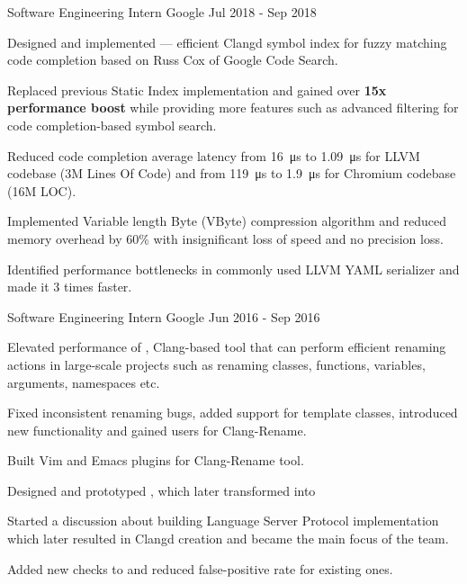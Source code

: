 \begin{cventries}
  \cventry
    {Software Engineering Intern}
    {Google}
    {}
    {Jul 2018 - Sep 2018}
    {
      \begin{cvitems}
        \item Designed and implemented
          --- efficient Clangd symbol index for fuzzy matching code completion
          based on Russ Cox
           of Google
          Code Search.
        \item Replaced previous Static Index implementation and gained over
          \textbf{15x performance boost} while providing more features such as
          advanced filtering for code completion-based symbol search.
        \item Reduced code completion average latency from \SI{16}{\us} to
          \SI{1.09}{\us} for LLVM codebase (3M Lines Of Code) and from
          \SI{119}{\us} to \SI{1.9}{\us} for Chromium codebase (16M LOC).
        \item Implemented Variable length Byte (VByte) compression algorithm
          and reduced memory overhead by 60\% with insignificant loss of
          speed and no precision loss.
        \item Identified performance bottlenecks in commonly used LLVM YAML
          serializer and made it 3 times faster.
      \end{cvitems}
    }

  \cventry
    {Software Engineering Intern}
    {Google}
    {}
    {Jun 2016 - Sep 2016}
    {
      \begin{cvitems}
        \item Elevated performance of
        ,
          Clang-based tool that can perform efficient renaming actions in
          large-scale projects such as renaming classes, functions,
          variables, arguments, namespaces etc.
        \item Fixed inconsistent renaming bugs, added support for template
          classes, introduced new functionality and gained users for
          Clang-Rename.
        \item Built Vim and Emacs plugins for Clang-Rename tool.
        \item Designed and prototyped
          ,
          which later transformed into
        \item Started a discussion about building Language Server Protocol
          implementation which later resulted in Clangd creation and became the
          main focus of the team.
        \item Added new checks to
           and
          reduced false-positive rate for existing ones.
      \end{cvitems}
    }


\end{cventries}
